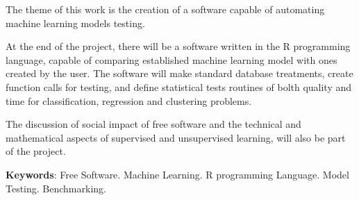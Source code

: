 


\begin{resumo}[Abstract]
The theme of this work is the creation of a software capable of automating machine learning models testing.

At the end of the project, there will be a software written in the R programming language, capable of comparing established machine learning model  with ones created by the user. The software will make standard database treatments, create function calls for testing, and define statistical tests routines of bolth quality and time for classification, regression and clustering problems.

The discussion of social impact of free software and the technical and mathematical aspects of supervised and unsupervised learning, will also be part of the project.

\textbf{Keywords}: Free Software. Machine Learning. R programming Language. Model Testing. Benchmarking.


\end{resumo}



